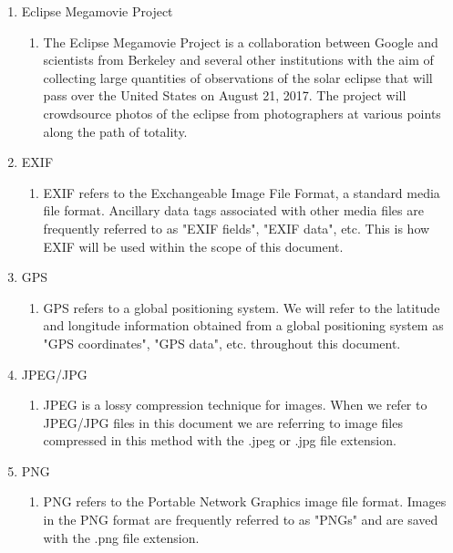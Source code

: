 \documentclass[10pt, onecolumn, draftclsnofoot, letterpaper, compsoc]{IEEEtran}
\begin{document}
\begin{enumerate}
	\item Eclipse Megamovie Project 
	\begin{enumerate}
		\item The Eclipse Megamovie Project is a collaboration between Google 
		and scientists from Berkeley and several other institutions with the 
		aim of collecting large quantities of observations of the solar eclipse
		that will pass over the United States on August 21, 2017. The project
		will crowdsource photos of the eclipse from photographers at various 
		points along the path of totality.
	\end{enumerate}

	\item EXIF
	\begin{enumerate}
		\item EXIF refers to the Exchangeable Image File Format, a standard 
		media file format. Ancillary data tags associated with other media 
		files are frequently referred to as "EXIF fields", "EXIF data", etc.
		 This is how EXIF will be used within the scope of this document.
	\end{enumerate}

	\item GPS
	\begin{enumerate}
		\item GPS refers to a global positioning system. We will refer to the
		 latitude and longitude information obtained from a global positioning 
		 system as "GPS coordinates", "GPS data", etc. throughout this document.
	\end{enumerate}

	\item JPEG/JPG
	\begin{enumerate}
		\item JPEG is a lossy compression technique for images. When we refer
		 to JPEG/JPG files in this document we are referring to image files 
		compressed in this method with the .jpeg or .jpg file extension.
	\end{enumerate}

	\item PNG
	\begin{enumerate}
		\item PNG refers to the Portable Network Graphics image file format. 
		Images in the PNG format are frequently referred to as "PNGs" and are 
		saved with the .png file extension.
	\end{enumerate}

\end{enumerate}
\end{document}
